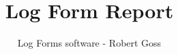 \documentclass{article}
\begin{document}
\WarningsOff
\ErrorsOff

\title{Log Form Report}
\author{Log Forms software - Robert Goss}

\maketitle



\end{document}
